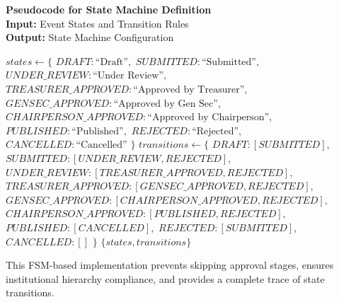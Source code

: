 \noindent\textbf{Pseudocode for State Machine Definition} 
\vspace{.2em} \\
\noindent\textbf{Input:} Event States and Transition Rules\\
\noindent\textbf{Output:} State Machine Configuration
\begin{algorithmic}[1]
    \State $states \gets \{$
    \State \hspace{1em} $DRAFT: \text{``Draft''},$
    \State \hspace{1em} $SUBMITTED: \text{``Submitted''},$
    \State \hspace{1em} $UNDER\_REVIEW: \text{``Under Review''},$
    \State \hspace{1em} $TREASURER\_APPROVED: \text{``Approved by Treasurer''},$
    \State \hspace{1em} $GENSEC\_APPROVED: \text{``Approved by Gen Sec''},$
    \State \hspace{1em} $CHAIRPERSON\_APPROVED: \text{``Approved by Chairperson''},$
    \State \hspace{1em} $PUBLISHED: \text{``Published''},$
    \State \hspace{1em} $REJECTED: \text{``Rejected''},$
    \State \hspace{1em} $CANCELLED: \text{``Cancelled''}$
    \State $\}$
    \State $transitions \gets \{$
    \State \hspace{1em} $DRAFT: [SUBMITTED],$
    \State \hspace{1em} $SUBMITTED: [UNDER\_REVIEW, REJECTED],$
    \State \hspace{1em} $UNDER\_REVIEW: [TREASURER\_APPROVED, REJECTED],$
    \State \hspace{1em} $TREASURER\_APPROVED: [GENSEC\_APPROVED, REJECTED],$
    \State \hspace{1em} $GENSEC\_APPROVED: [CHAIRPERSON\_APPROVED, REJECTED],$
    \State \hspace{1em} $CHAIRPERSON\_APPROVED: [PUBLISHED, REJECTED],$
    \State \hspace{1em} $PUBLISHED: [CANCELLED],$
    \State \hspace{1em} $REJECTED: [SUBMITTED],$
    \State \hspace{1em} $CANCELLED: []$
    \State $\}$
    \State \Return $\{states, transitions\}$
\EndFunction
\end{algorithmic}

This FSM-based implementation prevents skipping approval stages, ensures institutional hierarchy compliance, and provides a complete trace of state transitions.

